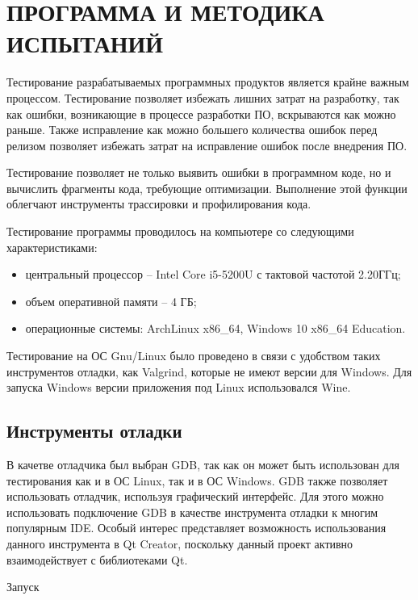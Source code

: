 \section{ПРОГРАММА И МЕТОДИКА ИСПЫТАНИЙ}
\label{sec:test}
Тестирование разрабатываемых программных продуктов является крайне важным процессом. Тестирование позволяет избежать
лишних затрат на разработку, так как ошибки, возникающие в процессе разработки ПО, вскрываются как можно раньше. Также
исправление как можно большего количества ошибок перед релизом позволяет избежать затрат на исправление ошибок после
внедрения ПО.

Тестирование позволяет не только выявить ошибки в программном коде, но и вычислить фрагменты кода, требующие
оптимизации. Выполнение этой функции облегчают инструменты трассировки и профилирования кода.

Тестирование программы проводилось на компьютере со следующими характеристиками:
\begin{itemize}
	\item центральный процессор -- Intel Core i5-5200U с тактовой частотой 2.20ГГц;
	\item объем оперативной памяти -- 4 ГБ;
	\item операционные системы: ArchLinux x86\_64, Windows 10 x86\_64 Education.
\end{itemize}

Тестирование на ОС Gnu/Linux было проведено в связи с удобством таких инструментов отладки, как Valgrind, которые не
имеют версии для Windows. Для запуска Windows версии приложения под Linux использовался Wine.

\subsection{Инструменты отладки}
В качетве отладчика был выбран GDB, так как он может быть использован для тестирования как и в ОС Linux, так и в ОС
Windows. GDB также позволяет использовать отладчик, используя графический интерфейс. Для этого можно использовать
подключение GDB в качестве инструмента отладки к многим популярным IDE. Особый интерес представляет возможность
использования данного инструмента в Qt Creator, поскольку данный проект активно взаимодействует с библиотеками Qt.

Запуск
\medskip
\begin{verbatim}
\end{verbatim}
\medskip
